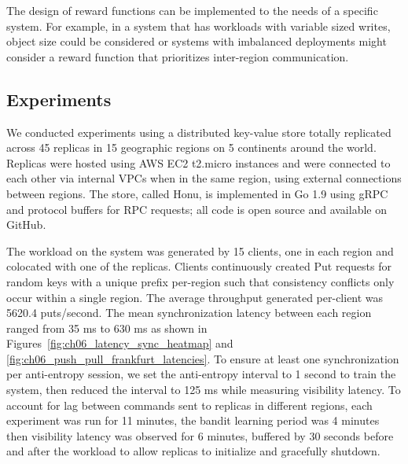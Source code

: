 The design of reward functions can be implemented to the needs of a specific
system.
For example, in a system that has workloads with variable sized writes, object
size could be considered or systems with imbalanced deployments might
consider a reward function that prioritizes inter-region communication.

\subsection{Experiments}
\label{ch06_experiments}

We conducted experiments using a distributed key-value store totally
replicated across 45 replicas in 15 geographic regions on 5 continents
around the world.
Replicas were hosted using AWS EC2 t2.micro instances and were connected to
each other via internal VPCs when in the same region, using external
connections between regions.
The store, called Honu, is implemented in Go 1.9 using gRPC and protocol
buffers for RPC requests; all code is open source and available on GitHub.

The workload on the system was generated by 15 clients, one in each region and
colocated with one of the replicas.
Clients continuously created Put requests for random keys with a unique
prefix per-region such that consistency conflicts only occur within a
single region.
The average throughput generated per-client was 5620.4 puts/second.
The mean synchronization latency between each region ranged from 35 ms to
630 ms as shown in Figures~\ref{fig:ch06_latency_sync_heatmap} and \ref{fig:ch06_push_pull_frankfurt_latencies}.
To ensure at least one synchronization per anti-entropy session, we set the
anti-entropy interval to 1 second to train the system, then reduced the
interval to 125 ms while measuring visibility latency.
To account for lag between commands sent to replicas in different regions,
each experiment was run for 11 minutes, the bandit learning period was 4
minutes then visibility latency was observed for 6 minutes, buffered by 30
seconds before and after the workload to allow replicas to initialize and
gracefully shutdown.

